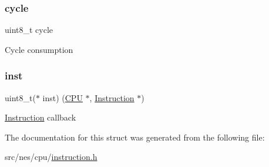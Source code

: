 \subsubsection{\texorpdfstring{cycle}{cycle}}
{\footnotesize\ttfamily uint8\+\_\+t cycle}

Cycle consumption \mbox{\label{struct_opcode_aaac3f46611559561cb0430bdb8d0741d}} 
\subsubsection{\texorpdfstring{inst}{inst}}
{\footnotesize\ttfamily uint8\+\_\+t($\ast$ inst) (\hyperlink{struct_c_p_u}{C\+PU} $\ast$, \hyperlink{struct_instruction}{Instruction} $\ast$)}

\hyperlink{struct_instruction}{Instruction} callback 

The documentation for this struct was generated from the following file\+:\begin{DoxyCompactItemize}
\item 
src/nes/cpu/\hyperlink{instruction_8h}{instruction.\+h}\end{DoxyCompactItemize}
